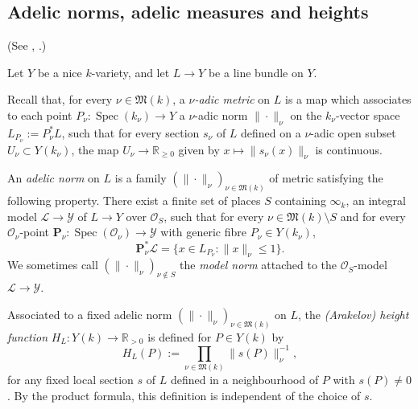 \documentclass[11pt,letterpaper]{amsart}
\newcommand{\BR}{{\mathbb {R}}}
\newcommand{\CL}{{\mathcal {L}}}
\newcommand{\CO}{{\mathcal {O}}}
\newcommand{\CY}{{\mathcal {Y}}}
\theoremstyle{plain}
\numberwithin{equation}{section}
\theoremstyle{definition}
\theoremstyle{remark}
\begin{document}
\subsection{Adelic norms, adelic measures and heights}\label{se:adelicmetric}
(See \cite[\S4]{Salberger}, \cite[\S2, \S3]{PeyreBeyond}.)

Let $Y$ be a nice $k$-variety, and let $L\to Y$ be a line bundle on $Y$. 

Recall that, for every $\nu\in\mathfrak{M}(k)$, a \emph{$\nu$-adic metric} on $L$ is a map which associates to each point $P_\nu:\operatorname{Spec}(k_\nu)\to Y$ a $\nu$-adic norm $\|\cdot\|_\nu$ on the $k_\nu$-vector space $L_{P_\nu}:=P_\nu^*L$, such that for every section $s_\nu$ of $L$ defined on a $\nu$-adic open subset $U_\nu\subset Y(k_\nu)$, the map $U_\nu\to\BR_{\geqslant 0}$ given by $x\mapsto \|s_\nu(x)\|_\nu$ is continuous. 


An \emph{adelic norm} on $L$ is a family $(\|\cdot\|_\nu)_{\nu\in\mathfrak{M}(k)}$ of metric satisfying the following property. There exist a finite set of places $S$ containing $\infty_k$, an integral model $\CL\to \CY$ of $L\to Y$ over $\CO_S$, such that  for every $\nu\in\mathfrak{M}(k)\setminus S$ and for every $\CO_\nu$-point $\mathbf{P}_\nu: \operatorname{Spec}(\CO_\nu)\to \CY$ with generic fibre $P_\nu\in Y(k_\nu)$,  $$\mathbf{P}_\nu^*\CL=\{x\in L_{P_\nu}:\|x\|_{\nu}\leqslant 1\}.$$
We sometimes call $(\|\cdot\|_\nu)_{\nu\notin S}$ the \emph{model norm} attached to the $\CO_S$-model $\CL\to \CY$.

Associated to a fixed adelic norm $(\|\cdot\|_\nu)_{\nu\in\mathfrak{M}(k)}$ on $L$, the \emph{(Arakelov) height function} $H_L: Y(k)\to\BR_{>0}$ is defined for $P\in Y(k)$ by \begin{equation}\label{eq:heightmetric}
	H_{L}(P):=\prod_{\nu\in\mathfrak{M}(k)}\|s(P)\|^{-1}_\nu,
\end{equation} for any fixed local section $s$ of $L$ defined in a neighbourhood of $P$ with $s(P)\neq 0$. By the product formula, this definition is independent of the choice of $s$.
\end{document}
